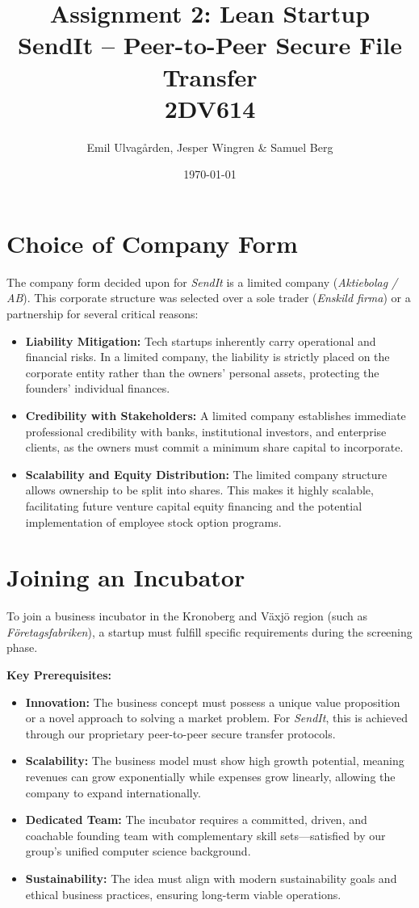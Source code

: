 \documentclass[12pt,a4paper]{article}
\title{\textbf{Assignment 2: Lean Startup}\\
       \large SendIt -- Peer-to-Peer Secure File Transfer\\[0.5em]
       \normalsize 2DV614}
\author{Emil Ulvagården, Jesper Wingren \& Samuel Berg}
\date{\today}
\begin{document}
\maketitle
\thispagestyle{empty}
\tableofcontents

\newpage
\section{Choice of Company Form}
The company form decided upon for \textit{SendIt} is a limited company (\textit{Aktiebolag / AB}). This corporate structure was selected over a sole trader (\textit{Enskild firma}) or a partnership for several critical reasons:

\begin{itemize}
    \item \textbf{Liability Mitigation:} Tech startups inherently carry operational and financial risks. In a limited company, the liability is strictly placed on the corporate entity rather than the owners' personal assets, protecting the founders' individual finances.
    \item \textbf{Credibility with Stakeholders:} A limited company establishes immediate professional credibility with banks, institutional investors, and enterprise clients, as the owners must commit a minimum share capital to incorporate.
    \item \textbf{Scalability and Equity Distribution:} The limited company structure allows ownership to be split into shares. This makes it highly scalable, facilitating future venture capital equity financing and the potential implementation of employee stock option programs.
\end{itemize}

\section{Joining an Incubator}
To join a business incubator in the Kronoberg and Växjö region (such as \textit{Företagsfabriken}), a startup must fulfill specific requirements during the screening phase.

{\large \textbf{Key Prerequisites:}}
\begin{itemize}
    \item \textbf{Innovation:} The business concept must possess a unique value proposition or a novel approach to solving a market problem. For \textit{SendIt}, this is achieved through our proprietary peer-to-peer secure transfer protocols.
    \item \textbf{Scalability:} The business model must show high growth potential, meaning revenues can grow exponentially while expenses grow linearly, allowing the company to expand internationally.
    \item \textbf{Dedicated Team:} The incubator requires a committed, driven, and coachable founding team with complementary skill sets—satisfied by our group's unified computer science background.
    \item \textbf{Sustainability:} The idea must align with modern sustainability goals and ethical business practices, ensuring long-term viable operations.
\end{itemize}
\end{document}
